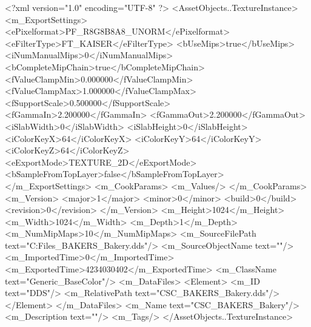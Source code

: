 <?xml version="1.0" encoding="UTF-8" ?>
<AssetObjects..TextureInstance>
	<m_ExportSettings>
		<ePixelformat>PF_R8G8B8A8_UNORM</ePixelformat>
		<eFilterType>FT_KAISER</eFilterType>
		<bUseMips>true</bUseMips>
		<iNumManualMips>0</iNumManualMips>
		<bCompleteMipChain>true</bCompleteMipChain>
		<fValueClampMin>0.000000</fValueClampMin>
		<fValueClampMax>1.000000</fValueClampMax>
		<fSupportScale>0.500000</fSupportScale>
		<fGammaIn>2.200000</fGammaIn>
		<fGammaOut>2.200000</fGammaOut>
		<iSlabWidth>0</iSlabWidth>
		<iSlabHeight>0</iSlabHeight>
		<iColorKeyX>64</iColorKeyX>
		<iColorKeyY>64</iColorKeyY>
		<iColorKeyZ>64</iColorKeyZ>
		<eExportMode>TEXTURE_2D</eExportMode>
		<bSampleFromTopLayer>false</bSampleFromTopLayer>
	</m_ExportSettings>
	<m_CookParams>
		<m_Values/>
	</m_CookParams>
	<m_Version>
		<major>1</major>
		<minor>0</minor>
		<build>0</build>
		<revision>0</revision>
	</m_Version>
	<m_Height>1024</m_Height>
	<m_Width>1024</m_Width>
	<m_Depth>1</m_Depth>
	<m_NumMipMaps>10</m_NumMipMaps>
	<m_SourceFilePath text="C:\Users\Shadow\Desktop\Working Files\Textures\CSC_BAKERS_Bakery.dds"/>
	<m_SourceObjectName text=""/>
	<m_ImportedTime>0</m_ImportedTime>
	<m_ExportedTime>4234030402</m_ExportedTime>
	<m_ClassName text="Generic_BaseColor"/>
	<m_DataFiles>
		<Element>
			<m_ID text="DDS"/>
			<m_RelativePath text="CSC_BAKERS_Bakery.dds"/>
		</Element>
	</m_DataFiles>
	<m_Name text="CSC_BAKERS_Bakery"/>
	<m_Description text=""/>
	<m_Tags/>
</AssetObjects..TextureInstance>

